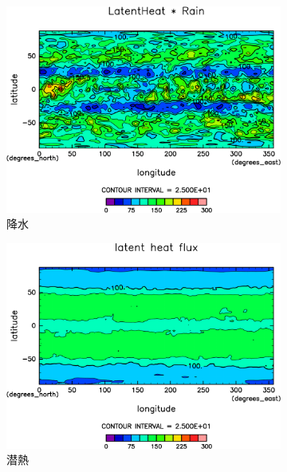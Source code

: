 \documentclass[body]{subfiles}
\begin{document}
\begin{figure}[t]
\begin{subfigure}{.4\textwidth}
		\includegraphics[width=\textwidth]{S2000/Rain,time=7300:7665-crop-rotate.pdf}
		\caption{降水\hmu*{[W/m^{-2}]}}\label{S2000降水}
	\end{subfigure}
	\begin{subfigure}{.4\textwidth}
		\centering
		\includegraphics[width=\textwidth]{S2000/Evap,time=7300:7665-crop-rotate.pdf}
		\caption{潜熱\hmu*{[W/m^{-2}]}}\label{S2000潜熱}
	\end{subfigure}
	\begin{subfigure}{.4\textwidth}
		\centering

\end{subfigure}
\end{figure}
\end{document}
